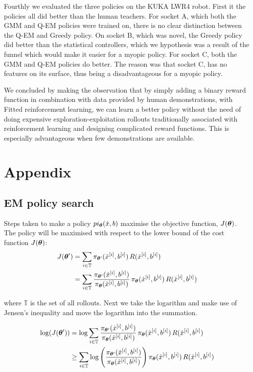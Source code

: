 Fourthly we evaluated the three policies on the KUKA LWR4 robot. First it the policies all did better than the human 
teachers. For socket A, which both the GMM and Q-EM policies were trained on, there is no clear distinction between 
the Q-EM and Greedy policy. On socket B, which was novel, the Greedy policy did better than the statistical controllers, 
which we hypothesis was a result of the funnel which would make it easier for a myopic policy. For socket C, both the 
GMM and Q-EM policies do better. The reason was that socket C, has no features on its surface, thus being a disadvantageous 
for a myopic policy.

We concluded by making the observation that by simply adding a binary reward function in combination with 
data provided by human demonstrations, with Fitted reinforcement learning, we can learn a better policy without 
the need of doing expensive exploration-exploitation  rollouts traditionally associated with reinforcement learning and 
designing complicated reward functions. This is especially advantageous when few demonstrations are available.

\section{Appendix}
\subsection{EM policy search}\label{app:lb}
Steps taken to make a policy $pi_{\boldsymbol{\theta}}(\dot{x},b)$ maximise the objective function, $J(\boldsymbol{\theta})$.
The policy will be maximised with respect to the lower bound of the cost function $J(\boldsymbol{\theta})$:
\begin{align}
  J(\boldsymbol{\theta}') &= \sum_{i \in \mathbb{T}} \pi_{\boldsymbol{\theta}'}(\dot{x}^{[i]},b^{[i]})\, R(\dot{x}^{[i]},b^{[i]}) \nonumber\\ 
	   &= \sum_{i \in \mathbb{T}}  \frac{\pi_{\boldsymbol{\theta}'}(\dot{x}^{[i]},b^{[i]})}{\pi_{\boldsymbol{\theta}}(\dot{x}^{[i]},b^{[i]})} \, \pi_{\boldsymbol{\theta}}(\dot{x}^{[i]},b^{[i]}) \, R(\dot{x}^{[i]},b^{[i]})
\end{align}

where $\mathbb{T}$ is the set of all rollouts. Next we take the logarithm and make use of Jensen's inequality and move the logarithm into the 
summation.

\begin{align}
  \log( J(\boldsymbol{\theta}') )  &= \log \sum_{i \in \mathbb{T}} \frac{\pi_{\boldsymbol{\theta}'}(\dot{x}^{[i]},b^{[i]})}{\pi_{\boldsymbol{\theta}}(\dot{x}^{[i]},b^{[i]})} \, \pi_{\boldsymbol{\theta}}(\dot{x}^{[i]},b^{[i]}) \, R(\dot{x}^{[i]},b^{[i]}) \nonumber \\
		     & \geq \sum_{i \in \mathbb{T}}\log\Bigg( \frac{\pi_{\boldsymbol{\theta}'}(\dot{x}^{[i]},b^{[i]})}{\pi_{\boldsymbol{\theta}}(\dot{x}^{[i]},b^{[i]})}\Bigg) \, \pi_{\boldsymbol{\theta}}(\dot{x}^{[i]},b^{[i]}) \, R(\dot{x}^{[i]},b^{[i]}) \label{eq:lower_bound}
\end{align}


